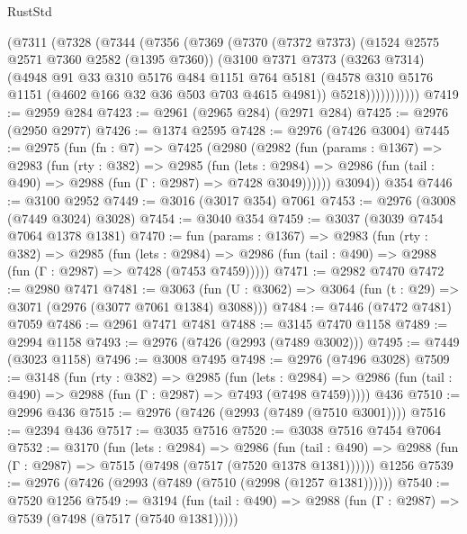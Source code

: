 \begin{lexlean}{RustStd}
\begin{coremodule}
          (@7311
            (@7328
              (@7344
                (@7356
                  (@7369
                    (@7370
                      (@7372 @7373)
                      (@1524 @2575 @2571 @7360 @2582 (@1395 @7360))
                      (@3100
                        @7371
                        @7373
                        (@3263 @7314)
                        (@4948
                          @91
                          @33
                          @310
                          @5176
                          @484
                          @1151
                          @764
                          @5181
                          (@4578 @310 @5176 @1151 (@4602 @166 @32 @36 @503 @703 @4615 @4981))
                          @5218)))))))))))
@7419 := @2959 @284
@7423 := @2961 (@2965 @284) (@2971 @284)
@7425 := @2976 (@2950 @2977)
@7426 := @1374 @2595
@7428 := @2976 (@7426 @3004)
@7445 := @2975
    (fun (fn : @7) =>
    @7425
      (@2980
        (@2982
          (fun (params : @1367) =>
          @2983
            (fun (rty : @382) =>
            @2985
              (fun (lets : @2984) =>
              @2986 (fun (tail : @490) => @2988 (fun (Γ : @2987) => @7428 @3049))))))
        @3094))
    @354
@7446 := @3100 @2952
@7449 := @3016 (@3017 @354) @7061
@7453 := @2976 (@3008 (@7449 @3024) @3028)
@7454 := @3040 @354
@7459 := @3037 (@3039 @7454 @7064 @1378 @1381)
@7470 := fun (params : @1367) =>
  @2983
    (fun (rty : @382) =>
    @2985
      (fun (lets : @2984) =>
      @2986 (fun (tail : @490) => @2988 (fun (Γ : @2987) => @7428 (@7453 @7459)))))
@7471 := @2982 @7470
@7472 := @2980 @7471
@7481 := @3063 (fun (U : @3062) => @3064 (fun (t : @29) => @3071 (@2976 (@3077 @7061 @1384) @3088)))
@7484 := @7446 (@7472 @7481) @7059
@7486 := @2961 @7471 @7481
@7488 := @3145 @7470 @1158
@7489 := @2994 @1158
@7493 := @2976 (@7426 (@2993 (@7489 @3002)))
@7495 := @7449 (@3023 @1158)
@7496 := @3008 @7495
@7498 := @2976 (@7496 @3028)
@7509 := @3148
    (fun (rty : @382) =>
    @2985
      (fun (lets : @2984) =>
      @2986 (fun (tail : @490) => @2988 (fun (Γ : @2987) => @7493 (@7498 @7459)))))
    @436
@7510 := @2996 @436
@7515 := @2976 (@7426 (@2993 (@7489 (@7510 @3001))))
@7516 := @2394 @436
@7517 := @3035 @7516
@7520 := @3038 @7516 @7454 @7064
@7532 := @3170
    (fun (lets : @2984) =>
    @2986
      (fun (tail : @490) => @2988 (fun (Γ : @2987) => @7515 (@7498 (@7517 (@7520 @1378 @1381))))))
    @1256
@7539 := @2976 (@7426 (@2993 (@7489 (@7510 (@2998 (@1257 @1381))))))
@7540 := @7520 @1256
@7549 := @3194
    (fun (tail : @490) => @2988 (fun (Γ : @2987) => @7539 (@7498 (@7517 (@7540 @1381)))))

\end{coremodule}
\end{lexlean}
